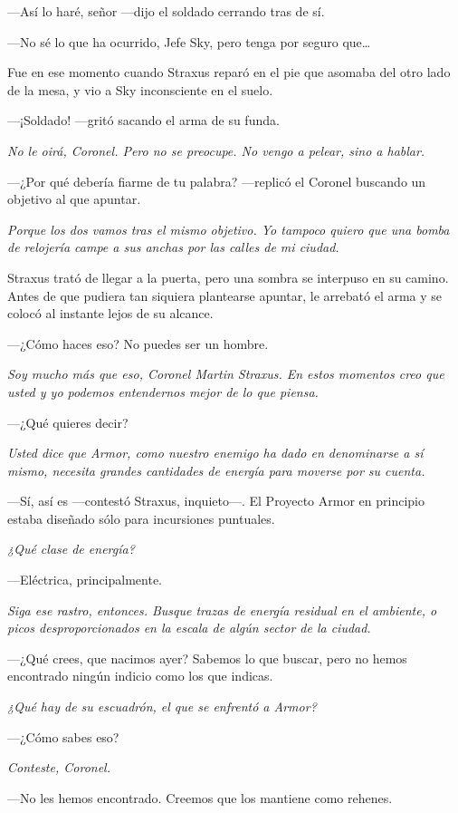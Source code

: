 ---Así lo haré, señor ---dijo el soldado cerrando tras de sí.

---No sé lo que ha ocurrido, Jefe Sky, pero tenga por seguro que\dots

Fue en ese momento cuando Straxus reparó en el pie que asomaba del otro lado de la mesa, y vio a Sky inconsciente en el suelo.

---¡Soldado! ---gritó sacando el arma de su funda.

\emph{No le oirá, Coronel. Pero no se preocupe. No vengo a pelear, sino a hablar.}

---¿Por qué debería fiarme de tu palabra? ---replicó el Coronel buscando un objetivo al que apuntar.

\emph{Porque los dos vamos tras el mismo objetivo. Yo tampoco quiero que una bomba de relojería campe a sus anchas por las calles de mi ciudad.}

Straxus trató de llegar a la puerta, pero una sombra se interpuso en su camino. Antes de que pudiera tan siquiera plantearse apuntar, le arrebató el arma y se colocó al instante lejos de su alcance.

---¿Cómo haces eso? No puedes ser un hombre.

\emph{Soy mucho más que eso, Coronel Martin Straxus. En estos momentos creo que usted y yo podemos entendernos mejor de lo que piensa.}

---¿Qué quieres decir?

\emph{Usted dice que Armor, como nuestro enemigo ha dado en denominarse a sí mismo, necesita grandes cantidades de energía para moverse por su cuenta.}

---Sí, así es ---contestó Straxus, inquieto---. El Proyecto Armor en principio estaba diseñado sólo para incursiones puntuales.

\emph{¿Qué clase de energía?}

---Eléctrica, principalmente.

\emph{Siga ese rastro, entonces. Busque trazas de energía residual en el ambiente, o picos desproporcionados en la escala de algún sector de la ciudad.}

---¿Qué crees, que nacimos ayer? Sabemos lo que buscar, pero no hemos encontrado ningún indicio como los que indicas.

\emph{¿Qué hay de su escuadrón, el que se enfrentó a Armor?}

---¿Cómo sabes eso?

\emph{Conteste, Coronel.}

---No les hemos encontrado. Creemos que los mantiene como rehenes.

